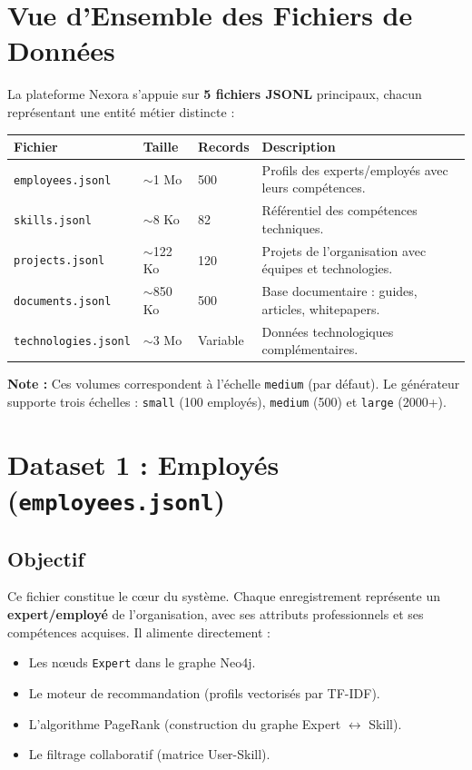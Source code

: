 \documentclass[12pt,a4paper]{article}
\begin{document}
\section{Vue d'Ensemble des Fichiers de Données}

La plateforme Nexora s'appuie sur \textbf{5 fichiers JSONL} principaux, chacun représentant une entité métier distincte :

\begin{longtable}{|p{3.5cm}|p{2cm}|p{2cm}|p{6cm}|}
\hline
\rowcolor{bleu!15}
\textbf{Fichier} & \textbf{Taille} & \textbf{Records} & \textbf{Description} \\
\hline
\texttt{employees.jsonl} & $\sim$1 Mo & 500 & Profils des experts/employés avec leurs compétences. \\
\hline
\texttt{skills.jsonl} & $\sim$8 Ko & 82 & Référentiel des compétences techniques. \\
\hline
\texttt{projects.jsonl} & $\sim$122 Ko & 120 & Projets de l'organisation avec équipes et technologies. \\
\hline
\texttt{documents.jsonl} & $\sim$850 Ko & 500 & Base documentaire : guides, articles, whitepapers. \\
\hline
\texttt{technologies.jsonl} & $\sim$3 Mo & Variable & Données technologiques complémentaires. \\
\hline
\end{longtable}

\textbf{Note :} Ces volumes correspondent à l'échelle \texttt{medium} (par défaut). Le générateur supporte trois échelles : \texttt{small} (100 employés), \texttt{medium} (500) et \texttt{large} (2000+).

\section{Dataset 1 : Employés (\texttt{employees.jsonl})}

\subsection{Objectif}

Ce fichier constitue le cœur du système. Chaque enregistrement représente un \textbf{expert/employé} de l'organisation, avec ses attributs professionnels et ses compétences acquises. Il alimente directement :
\begin{itemize}[leftmargin=*]
    \item Les nœuds \texttt{Expert} dans le graphe Neo4j.
    \item Le moteur de recommandation (profils vectorisés par TF-IDF).
    \item L'algorithme PageRank (construction du graphe Expert $\leftrightarrow$ Skill).
    \item Le filtrage collaboratif (matrice User-Skill).
\end{itemize}
\end{document}
